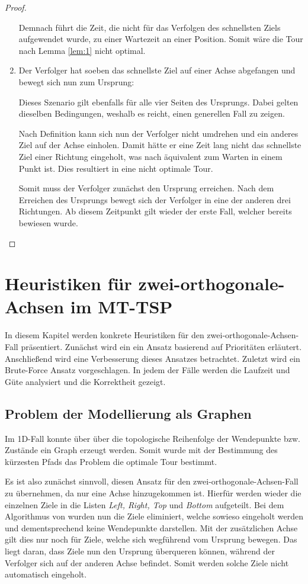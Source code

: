 \documentclass[german,version-2019-11]{uzl-thesis}
\begin{document}
\begin{proof}
\begin{enumerate}
Demnach führt die Zeit, die nicht für das Verfolgen des schnellsten Ziels aufgewendet wurde, zu einer Wartezeit an einer Position. Somit wäre die Tour nach Lemma \ref{lem:1} nicht optimal.\\

\item 
Der Verfolger hat soeben das schnellste Ziel auf einer Achse abgefangen und bewegt sich nun zum Ursprung:

Dieses Szenario gilt ebenfalls für alle vier Seiten des Ursprungs. Dabei gelten dieselben Bedingungen, weshalb es reicht, einen generellen Fall zu zeigen. 

Nach Definition kann sich nun der Verfolger nicht umdrehen und ein anderes Ziel auf der Achse einholen. Damit hätte er eine Zeit lang nicht das schnellste Ziel einer Richtung eingeholt, was  nach \cite{helvig} äquivalent zum Warten in einem Punkt ist. Dies resultiert in eine nicht optimale Tour.

Somit muss der Verfolger zunächst den Ursprung erreichen. Nach dem Erreichen des Ursprungs bewegt  sich der Verfolger in eine der anderen drei Richtungen. Ab diesem Zeitpunkt gilt wieder der erste Fall, welcher bereits bewiesen wurde.
\end{enumerate} 
\end{proof}


\chapter{Heuristiken für zwei-orthogonale-Achsen im MT-TSP}
\label{kap4}
In diesem Kapitel werden konkrete Heuristiken für den zwei-orthogonale-Achsen-Fall präsentiert. Zunächst wird ein ein Ansatz basierend auf Prioritäten erläutert. Anschließend wird eine Verbesserung dieses Ansatzes betrachtet. Zuletzt wird ein Brute-Force Ansatz vorgeschlagen. In jedem der Fälle werden die Laufzeit und Güte analysiert und die Korrektheit gezeigt.

\section{Problem der Modellierung als Graphen}
Im 1D-Fall konnte über über die topologische Reihenfolge der Wendepunkte bzw. Zustände ein Graph erzeugt werden. Somit wurde mit der Bestimmung des kürzesten Pfads das Problem die optimale Tour bestimmt. 

Es ist also zunächst sinnvoll, diesen Ansatz für den zwei-orthogonale-Achsen-Fall zu übernehmen, da nur eine Achse hinzugekommen ist. Hierfür werden wieder die einzelnen Ziele in die Listen \emph{Left, Right, Top} und \emph{Bottom} aufgeteilt. Bei dem Algorithmus von \cite{helvig} wurden nun die Ziele eliminiert, welche sowieso eingeholt werden und dementsprechend keine Wendepunkte darstellen. Mit der zusätzlichen Achse gilt dies nur noch für Ziele, welche sich wegführend vom Ursprung bewegen. Das liegt daran, dass Ziele nun den Ursprung überqueren können, während der Verfolger sich auf der anderen Achse befindet. Somit werden solche Ziele nicht automatisch eingeholt. 
\end{document}
